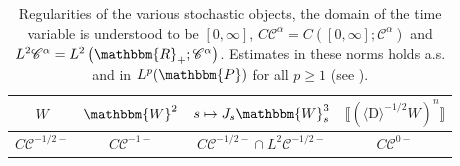\documentclass[11pt]{article}
\newcommand{\mathD}{\mathrm{D}}
\newcommand{\VV}{\mathscr{C}}
\begin{document}
\begin{table}[h]
\centering
  \begin{tabular}{cccc}
    $W$ & $\mathbbm{W}^2$ & $s \mapsto J_s \mathbbm{W}_s^3$ &
    $\llbracket (\langle \mathD \rangle^{- 1 / 2} W)^n \rrbracket$\\
    \hline
    $C \VV^{- 1 / 2 -}$ & $C \VV^{- 1 -}$ & $C \VV^{- 1 / 2 -} \cap L^2 \VV^{-
    1 / 2 -}$ & $C \VV^{0 -}$
  \end{tabular}
  \caption{\label{table:reg}Regularities of the various stochastic objects,
  the domain of the time variable is understood to be $[0, \infty]$, $C
  \VV^{\alpha} = C \left( [0, \infty] ; \VV^{\alpha} \right)$ and $L^2
  \VV^{\alpha} = L^2 \left( \mathbbm{R}_+ ; \VV^{\alpha} \right)$. Estimates
  in these norms holds a.s. and in $L^p (\mathbbm{P})$ for all $p \geqslant 1$
  (see {\cite{barashkov_gubinelli_variational}}).}
\end{table}
\end{document}
